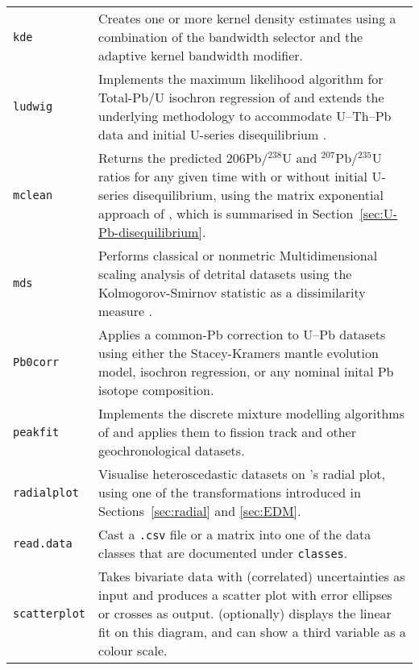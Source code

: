 \begin{refsection}
\begin{longtable}{@{}p{.2\linewidth}@{}p{.8\linewidth}@{}}
\texttt{kde} & Creates one or more kernel density estimates using a
combination of the \citet{botev2010} bandwidth selector and the
\citet{abramson1982} adaptive kernel bandwidth modifier.\\

\texttt{ludwig} & Implements the maximum likelihood algorithm for
Total-Pb/U isochron regression of \citet{ludwig1998} and extends the
underlying methodology to accommodate U--Th--Pb data
\citep{vermeesch2021} and initial U-series disequilibrium
\citep{mclean2016b}.\\

\texttt{mclean} & Returns the predicted ${206}$Pb/$^{238}$U and
$^{207}$Pb/$^{235}$U ratios for any given time with or without initial
U-series disequilibrium, using the matrix exponential approach of
\citet{mclean2016b}, which is summarised in
Section~\ref{sec:U-Pb-disequilibrium}. \\

\texttt{mds} & Performs classical or nonmetric Multidimensional
scaling analysis of detrital datasets using the Kolmogorov-Smirnov
statistic as a dissimilarity measure \citep{vermeesch2013}.\\

\texttt{Pb0corr} & Applies a common-Pb correction to U--Pb datasets
using either the Stacey-Kramers mantle evolution model, isochron
regression, or any nominal inital Pb isotope composition.\\

\texttt{peakfit} & Implements the discrete mixture modelling
algorithms of \citet{galbraith1993} and applies them to fission track
and other geochronological datasets.\\

\texttt{radialplot} & Visualise heteroscedastic datasets on
\citet{galbraith1988}'s radial plot, using one of the transformations
introduced in Sections~\ref{sec:radial} and \ref{sec:EDM}.\\

\texttt{read.data} & Cast a \texttt{.csv} file or a matrix into one of
the data classes that are documented under \texttt{classes}.\\

\texttt{scatterplot} & Takes bivariate data with (correlated)
uncertainties as input and produces a scatter plot with error ellipses
or crosses as output.  (optionally) displays the linear fit on this
diagram, and can show a third variable as a colour scale.\\


\end{longtable}
\end{refsection}

